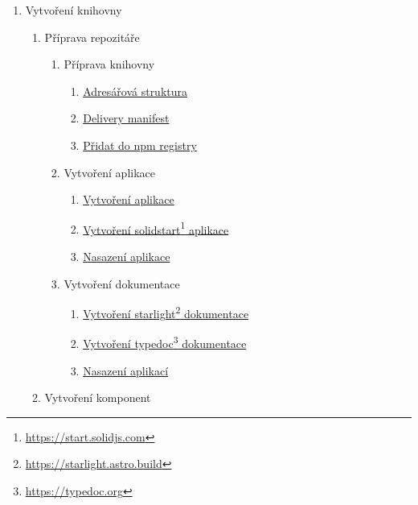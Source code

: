 \begin{enumerate}[label=\arabic*.]
    \item Vytvoření knihovny
          \begin{enumerate}[label*=\arabic*.]
              \item Příprava repozitáře
                    \begin{enumerate}[label*=\arabic*.]
                        \item Příprava knihovny
                              \begin{enumerate}[label*=\arabic*.]
                                  \item \ul{Adresářová struktura}
                                  \item \ul{Delivery manifest}
                                  \item \ul{Přidat do npm registry}
                              \end{enumerate}
                        \item Vytvoření aplikace
                              \begin{enumerate}[label*=\arabic*.]
                                  \item \ul{Vytvoření aplikace}
                                  \item \ul{Vytvoření solidstart\footnote{\url{https://start.solidjs.com}} aplikace}
                                  \item \ul{Nasazení aplikace}
                              \end{enumerate}
                        \item Vytvoření dokumentace
                              \begin{enumerate}[label*=\arabic*.]
                                  \item \ul{Vytvoření starlight\footnote{\url{https://starlight.astro.build}} dokumentace}
                                  \item \ul{Vytvoření typedoc\footnote{\url{https://typedoc.org}} dokumentace}
                                  \item \ul{Nasazení aplikací}
                              \end{enumerate}
                    \end{enumerate}
              \item Vytvoření komponent
                    \begin{enumerate}[label*=\arabic*.]

\end{enumerate}
\end{enumerate}
\end{enumerate}
